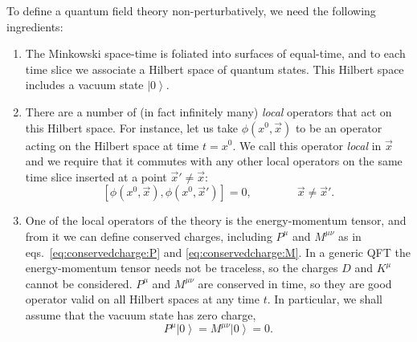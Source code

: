 \documentclass[a4paper,12pt]{article}
\newcommand{\ket}[1]{\left| #1 \right\rangle}
\numberwithin{equation}{section}
\begin{document}
To define a quantum field theory non-perturbatively, we need the following ingredients:
\begin{enumerate}

\item
The Minkowski space-time is foliated into surfaces of equal-time,
and to each time slice we associate a Hilbert space of quantum states.
This Hilbert space includes a vacuum state $\ket{0}$.

\item
There are a number of (in fact infinitely many) \emph{local} operators that act on this Hilbert space. For instance, let us take $\phi(x^0, \vec{x})$ to be an operator acting on the Hilbert space at time $t = x^0$.
We call this operator \emph{local} in $\vec{x}$ and we require that it commutes with any other local operators on the same time slice inserted at a point $\vec{x}' \neq \vec{x}$:
\begin{equation}
	\left[ \phi(x^0, \vec{x}), \phi(x^0, \vec{x}') \right]
	= 0,
	\qquad\qquad
	\vec{x} \neq \vec{x}'.
	\label{eq:locality:equaltime}
\end{equation}

\item
One of the local operators of the theory is the energy-momentum tensor, and from it we can define conserved charges, including $P^\mu$ and $M^{\mu\nu}$ as in eqs.~\eqref{eq:conservedcharge:P} and \eqref{eq:conservedcharge:M}. In a generic QFT the energy-momentum tensor needs not be traceless, so the charges $D$ and $K^\mu$ cannot be considered. 
$P^\mu$ and $M^{\mu\nu}$ are conserved in time, so they are good operator valid on all Hilbert spaces at any time $t$. 
In particular, we shall assume that the vacuum state has zero charge,
\begin{equation}
	P^\mu \ket{0} = M^{\mu\nu} \ket{0} = 0.
	\label{eq:vacuuminvariance:P}
\end{equation}


\end{enumerate}
\end{document}
